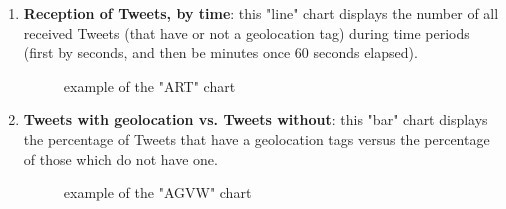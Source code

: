 \documentclass[a4paper,11pt]{report}
\begin{document}
\begin{enumerate}
\begin{enumerate}
		\item \textbf{Reception of Tweets, by time}: this "line" chart displays the number of all received Tweets (that have or not a geolocation tag) during time periods (first by seconds, and then be minutes once 60 seconds elapsed).
		\begin{figure}[H]
		\vspace{-5pt}
		\begin{center}
		\vspace{-5pt}
		\caption{example of the "ART" chart}
		\end{center}
		\end{figure}
		\vspace{-10pt}
		
		\item \textbf{Tweets with geolocation vs. Tweets without}: this "bar" chart displays the percentage of Tweets that have a geolocation tags versus the percentage of those which do not have one.
		\begin{figure}[H]
		\vspace{-5pt}
		\begin{center}
		\vspace{-5pt}
		\caption{example of the "AGVW" chart}
		\end{center}
		\end{figure}
		\vspace{-10pt}
	 \end{enumerate}
\end{enumerate}
\end{document}
